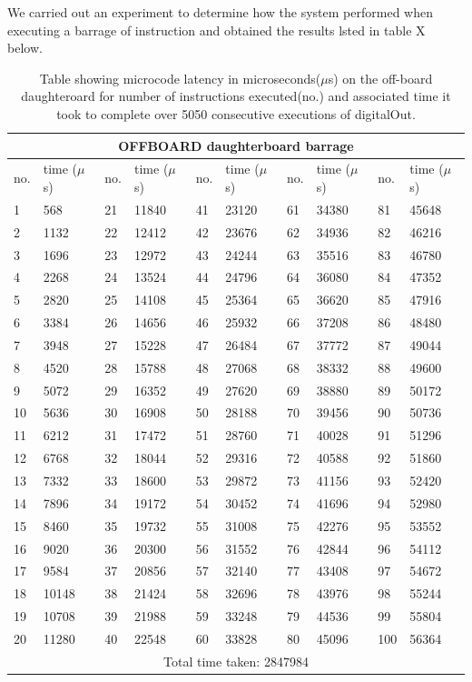 We carried out an experiment to determine how the system performed when executing a barrage of instruction and obtained the results lsted in table X below. 
\begin{table}[H]
	\centering
	\caption{Table showing microcode latency in microseconds($\mu$s) on the off-board daughteroard for number of instructions executed(no.) and associated time it took to complete over 5050 consecutive executions of digitalOut.}
	
	\begin{tabular}{|l|l||l|l||l|l||l|l||l|l||}
	\toprule
 \multicolumn{10}{c}{\textbf{OFFBOARD daughterboard barrage}} \\\hline


no. & time ($\mu$s)& no. & time ($\mu$s)& no. & time ($\mu$s)& no. & time ($\mu$s)& no. & time ($\mu$s) \\\hline
1 & 568 & 21 & 11840 & 41 & 23120 & 61 & 34380 & 81 & 45648 \\\hline
2 & 1132 & 22 & 12412 & 42 & 23676 & 62 & 34936 & 82 & 46216 \\\hline
3 & 1696 & 23 & 12972 & 43 & 24244 & 63 & 35516 & 83 & 46780 \\\hline
4 & 2268 & 24 & 13524 & 44 & 24796 & 64 & 36080 & 84 & 47352 \\\hline
5 & 2820 & 25 & 14108 & 45 & 25364 & 65 & 36620 & 85 & 47916 \\\hline
6 & 3384 & 26 & 14656 & 46 & 25932 & 66 & 37208 & 86 & 48480 \\\hline
7 & 3948 & 27 & 15228 & 47 & 26484 & 67 & 37772 & 87 & 49044 \\\hline
8 & 4520 & 28 & 15788 & 48 & 27068 & 68 & 38332 & 88 & 49600 \\\hline
9 & 5072 & 29 & 16352 & 49 & 27620 & 69 & 38880 & 89 & 50172 \\\hline
10 & 5636 & 30 & 16908 & 50 & 28188 & 70 & 39456 & 90 & 50736 \\\hline
11 & 6212 & 31 & 17472 & 51 & 28760 & 71 & 40028 & 91 & 51296 \\\hline
12 & 6768 & 32 & 18044 & 52 & 29316 & 72 & 40588 & 92 & 51860 \\\hline
13 & 7332 & 33 & 18600 & 53 & 29872 & 73 & 41156 & 93 & 52420 \\\hline
14 & 7896 & 34 & 19172 & 54 & 30452 & 74 & 41696 & 94 & 52980 \\\hline
15 & 8460 & 35 & 19732 & 55 & 31008 & 75 & 42276 & 95 & 53552 \\\hline
16 & 9020 & 36 & 20300 & 56 & 31552 & 76 & 42844 & 96 & 54112 \\\hline
17 & 9584 & 37 & 20856 & 57 & 32140 & 77 & 43408 & 97 & 54672 \\\hline
18 & 10148 & 38 & 21424 & 58 & 32696 & 78 & 43976 & 98 & 55244 \\\hline
19 & 10708 & 39 & 21988 & 59 & 33248 & 79 & 44536 & 99 & 55804 \\\hline
20 & 11280 & 40 & 22548 & 60 & 33828 & 80 & 45096 & 100 & 56364 \\\hline
\multicolumn{10}{c}{Total time taken: 2847984} \\\hline
\end{tabular}
\end{table}
